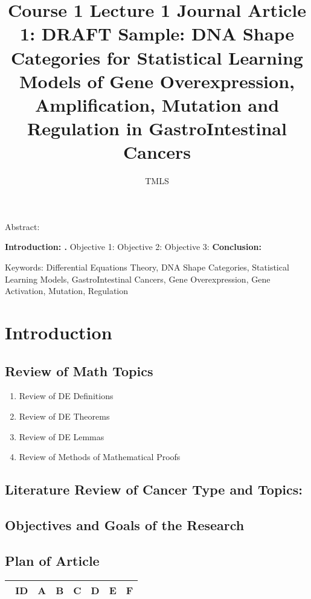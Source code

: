 \documentclass[preprint, 8pt]{elsarticle}
\theoremstyle{definition}
\begin{document}
\begin{frontmatter}
		\title{Course 1 Lecture 1 Journal Article 1:  DRAFT Sample: DNA Shape Categories for Statistical Learning Models of Gene Overexpression, Amplification, Mutation and Regulation in GastroIntestinal Cancers}
		\author{TMLS }
		\address{}
		\ead{}	
\end{frontmatter}	
Abstract:
	
\textbf{Introduction: . }
Objective 1: 
Objective 2: 
Objective 3: 
\textbf{Conclusion:}

Keywords: Differential Equations Theory, DNA Shape Categories, Statistical Learning Models, GastroIntestinal Cancers, Gene Overexpression, Gene Activation, Mutation, Regulation 

\section{Introduction}

\subsection{Review of Math Topics}

\begin{enumerate}
\item Review of DE Definitions
\item Review of DE Theorems
\item Review of DE Lemmas
\item Review of Methods of Mathematical Proofs 
\end{enumerate}

\subsection{Literature Review of Cancer Type and Topics:}

\subsection{Objectives and Goals of the Research}

\subsection{Plan of Article}

\begin{table}[H]\centering
\begin{tabular}{p{1cm}p{1cm}p{1cm}p{1cm}p{1cm}p{1cm}p{4cm}}\
ID & A & B & C & D & E & F \\
\hline
\hline
\end{tabular}
\end{table}
\end{document}
